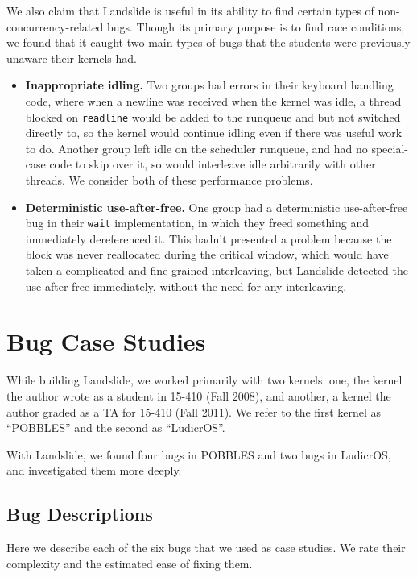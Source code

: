 We also claim that Landslide is useful in its ability to find certain types of non-concurrency-related bugs. Though its primary purpose is to find race conditions, we found that it caught two main types of bugs that the students were previously unaware their kernels had.

\begin{itemize}
	\item {\bf Inappropriate idling.} Two groups had errors in their keyboard handling code, where when a newline was received when the kernel was idle, a thread blocked on \texttt{readline} would be added to the runqueue and but not switched directly to, so the kernel would continue idling even if there was useful work to do. Another group left idle on the scheduler runqueue, and had no special-case code to skip over it, so would interleave idle arbitrarily with other threads. We consider both of these performance problems.
	\item {\bf Deterministic use-after-free.} One group had a deterministic use-after-free bug in their \texttt{wait} implementation, in which they freed something and immediately dereferenced it. This hadn't presented a problem because the block was never reallocated during the critical window, which would have taken a complicated and fine-grained interleaving, but Landslide detected the use-after-free immediately, without the need for any interleaving.
\end{itemize}

\section{Bug Case Studies}
\label{sec:eval-casestudy}

While building Landslide, we worked primarily with two kernels: one, the kernel the author wrote as a student in 15-410 (Fall 2008), and another, a kernel the author graded as a TA for 15-410 (Fall 2011). We refer to the first kernel as ``POBBLES'' and the second as ``LudicrOS''.

With Landslide, we found four bugs in POBBLES and two bugs in LudicrOS, and investigated them more deeply.

\subsection{Bug Descriptions}

Here we describe each of the six bugs that we used as case studies. We rate their complexity and the estimated ease of fixing them.

